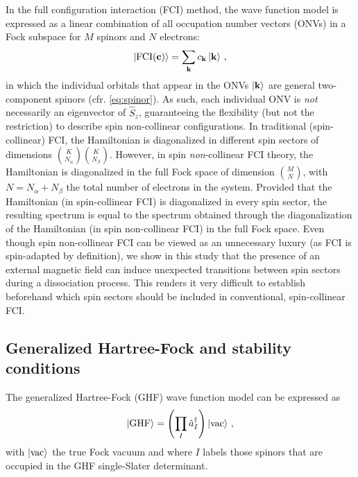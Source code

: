 \documentclass[journal=jctc,manuscript=article]{achemso}
\begin{document}
        In the full configuration interaction (FCI) method, the wave function model is expressed as a linear combination of all occupation number vectors (ONVs) in a Fock subspace for $M$ spinors and $N$ electrons:\cite{Helgaker.2000}
        \begin{equation}
            \ket{\text{FCI}(\vb{c})}
            = \sum_{\vb{k}} c_{\vb{k}} \ket{\vb{k}}
            \thinspace ,
        \end{equation}
        in which the individual orbitals that appear in the ONVs $\ket{\vb{k}}$ are general two-component spinors (cfr. \cref{eq:spinor}).
        As such, each individual ONV is \emph{not} necessarily an eigenvector of $\hat{S}_z$, guaranteeing the flexibility (but not the restriction) to describe spin non-collinear configurations.
        In traditional (spin-collinear) FCI, the Hamiltonian is diagonalized in different spin sectors of dimensions $\binom{K}{N_\alpha} \binom{K}{N_\beta}$.
        However, in spin \emph{non}-collinear FCI theory, the Hamiltonian is diagonalized in the full Fock space of dimension $\binom{M}{N}$, with $N = N_\alpha + N_\beta$ the total number of electrons in the system.\cite{Helgaker.2000}
        Provided that the Hamiltonian (in spin-collinear FCI) is diagonalized in every spin sector, the resulting spectrum is equal to the spectrum obtained through the diagonalization of the Hamiltonian (in spin non-collinear FCI) in the full Fock space.
        Even though spin non-collinear FCI can be viewed as an unnecessary luxury (as FCI is spin-adapted by definition), we show in this study that the presence of an external magnetic field can induce unexpected transitions between spin sectors during a dissociation process. 
        This renders it very difficult to establish beforehand which spin sectors should be included in conventional, spin-collinear FCI.

        \subsection{Generalized Hartree-Fock and stability conditions}

        The generalized Hartree-Fock (GHF) wave function model\cite{Fukutome.1981, Lowdin.1992} can be expressed as
        \begin{equation}
            \ket{\text{GHF}}
            = \qty(
                \prod_I \hat{a}^\dagger_I
            ) \ket{\text{vac}}
            \thinspace ,
        \end{equation}
        with $\ket{\text{vac}}$ the true Fock vacuum and where $I$ labels those spinors that are occupied in the GHF single-Slater determinant.
\end{document}
